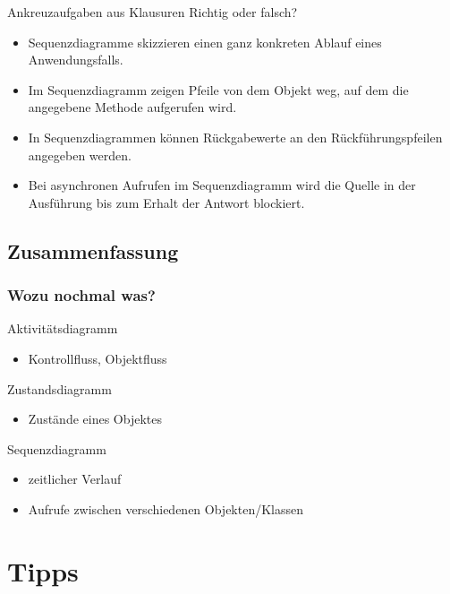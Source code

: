 \documentclass[18pt]{beamer}
\newcommand{\cmark}{\ding{51}}%
\newcommand{\xmark}{\ding{55}}%
\begin{document}
\begin{frame}{Ankreuzaufgaben aus Klausuren}
Richtig oder falsch?
\begin{itemize}
	\item Sequenzdiagramme skizzieren einen ganz konkreten Ablauf eines Anwendungsfalls.\pause ~\textcolor{green}{\cmark}
	\item Im Sequenzdiagramm zeigen Pfeile von dem Objekt weg, auf dem die angegebene Methode aufgerufen wird.\pause ~\textcolor{red}{\xmark}
	\item In Sequenzdiagrammen können Rückgabewerte an den Rückführungspfeilen angegeben werden.
	\pause ~\textcolor{green}{\cmark}
	\item Bei asynchronen Aufrufen im Sequenzdiagramm wird die Quelle in der Ausführung bis zum Erhalt der Antwort blockiert.\pause ~\textcolor{red}{\xmark}
\end{itemize}
\end{frame}

	\subsection{Zusammenfassung}
	\begin{frame}
		\frametitle{Wozu nochmal was?}
		\begin{block}{Aktivitätsdiagramm}
			\begin{itemize}
				\item Kontrollfluss, Objektfluss
			\end{itemize}
		\end{block}
	\pause
	\begin{block}{Zustandsdiagramm}
		\begin{itemize}
			\item Zustände eines Objektes
		\end{itemize}
	\end{block}
	\pause
	\begin{block}{Sequenzdiagramm}
		\begin{itemize}
			\item zeitlicher Verlauf
			\item Aufrufe zwischen verschiedenen Objekten/Klassen
		\end{itemize}
	\end{block}
\end{frame}

\section{Tipps}
\end{document}
